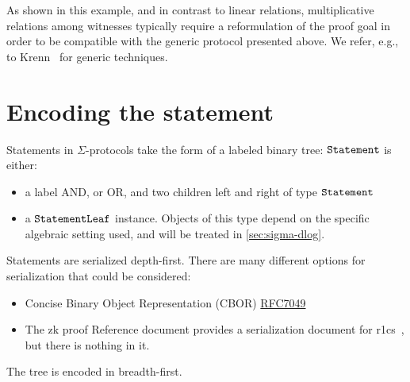 \documentclass[runningheads,11pt]{article}
\begin{document}
As shown in this example, and in contrast to linear relations, multiplicative relations among witnesses typically require a reformulation of the proof goal in order to be compatible with the generic protocol presented above.
We refer, e.g., to Krenn~\cite{krenn12} for generic techniques.



\section{Encoding the statement}

Statements in $\Sigma$-protocols take the form of a labeled binary tree:
$\texttt{Statement}$ is either:
\begin{itemize}
  \item a label \textsf{AND}, or \textsf{OR}, and two children \textsf{left} and \textsf{right} of type $\texttt{Statement}$
  \item a $\texttt{StatementLeaf}$ instance. Objects of this type depend on the specific algebraic setting used, and will be treated in \cref{sec:sigma-dlog}.
\end{itemize}
Statements are serialized depth-first.
  There are many different options for serialization that could be considered:
  \begin{itemize}
  \item Concise Binary Object Representation (CBOR) \href{https://datatracker.ietf.org/doc/html/rfc7049}{RFC7049}
    \item The zk proof Reference document provides a serialization document for r1cs~\cite[3.4.2]{zkproof-reference}, but there is nothing in it.
\end{itemize}
The tree is encoded in breadth-first.






\end{document}
